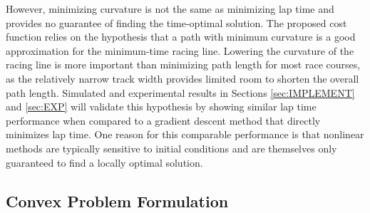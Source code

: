 \documentclass[twocolumn,10pt]{asme2ej}
\begin{document}
 However, minimizing curvature is not the same as minimizing lap time and provides
 no guarantee of finding the time-optimal solution. The proposed cost function relies on the hypothesis that a path with minimum curvature is a good approximation for
 the minimum-time racing line. Lowering the curvature of the racing line is more important than minimizing
 path length for most race courses, as the relatively narrow track width provides limited room to shorten the overall path length. Simulated and experimental results
 in Sections \ref{sec:IMPLEMENT} and \ref{sec:EXP} will validate this hypothesis by showing similar lap time performance when compared to
 a gradient descent method that directly minimizes lap time. One reason for this comparable performance is that nonlinear methods are
 typically sensitive to initial conditions and are themselves only guaranteed to find a locally optimal solution.  

\subsection{Convex Problem Formulation}
\end{document}
